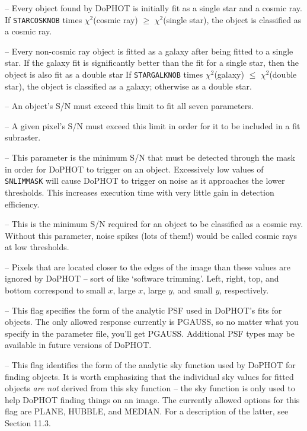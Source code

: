  -- Every object found by DoPHOT
is initially fit as a single star and a cosmic ray.
If {\tt STARCOSKNOB} times $\chi^2$(cosmic ray) $\geq$ 
$\chi^2$(single star), the object is classified as a
cosmic ray.  

 -- Every non-cosmic ray
object is fitted as a galaxy after being fitted to a single star.
If the galaxy fit is significantly better than the fit for a
single star, then the object is also fit as a double star 
If {\tt STARGALKNOB} times $\chi^2$(galaxy) $\leq$ 
$\chi^2$(double star), the object is classified as a 
galaxy; otherwise as a double star.  

 -- An object's S/N must exceed this limit
to fit all seven parameters.  

 -- A given pixel's S/N must exceed this limit
in order for it to be included in a fit subraster.

 -- This parameter is the minimum S/N that
must be detected through the mask in order for DoPHOT to 
trigger on an object.   
Excessively low values of
{\tt SNLIMMASK} will cause DoPHOT to trigger on noise as it
approaches the lower thresholds.  This increases execution time with 
very little gain in detection efficiency.

 -- This is the minimum S/N required for 
an object to be classified as a cosmic ray.  Without
this parameter, noise spikes (lots of them!) would be called cosmic rays at 
low thresholds.  

 -- Pixels
that are located closer to the edges of the image than these 
values are ignored
by DoPHOT -- sort of like `software trimming'.  Left, right,
top, and bottom correspond to small $x$, large $x$, large $y$, and
small $y$, respectively.

 -- This flag specifies the form of the
analytic PSF used in DoPHOT's fits for objects.  The only
allowed response currently is PGAUSS, so no matter what you
specify in the parameter file, you'll get PGAUSS.  Additional 
PSF types may be available in future versions of DoPHOT.

 -- This flag identifies the form of the
analytic sky function used by DoPHOT for finding objects.  
It is worth emphasizing that the individual sky values for 
fitted objects {\it are not} derived from this sky function --
the sky function 
is only used to help DoPHOT finding things on an image.  The
currently allowed options for this flag are PLANE, HUBBLE, and MEDIAN.
For a description of the latter, see Section 11.3.

